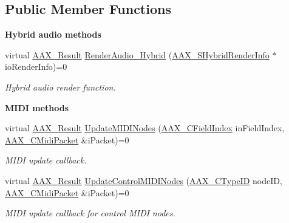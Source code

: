 \subsection*{Public Member Functions}
\begin{Indent}\textbf{ Hybrid audio methods}\par
\begin{DoxyCompactItemize}
\item 
virtual \mbox{\hyperlink{a00392_a4d8f69a697df7f70c3a8e9b8ee130d2f}{A\+A\+X\+\_\+\+Result}} \mbox{\hyperlink{a00805_gae6139041de22f51f3146d26a01c54c1b}{Render\+Audio\+\_\+\+Hybrid}} (\mbox{\hyperlink{a01673}{A\+A\+X\+\_\+\+S\+Hybrid\+Render\+Info}} $\ast$io\+Render\+Info)=0
\begin{DoxyCompactList}\small\item\em Hybrid audio render function. \end{DoxyCompactList}\end{DoxyCompactItemize}
\end{Indent}
\begin{Indent}\textbf{ M\+I\+DI methods}\par
\begin{DoxyCompactItemize}
\item 
virtual \mbox{\hyperlink{a00392_a4d8f69a697df7f70c3a8e9b8ee130d2f}{A\+A\+X\+\_\+\+Result}} \mbox{\hyperlink{a01677_a229029f0d4bd758538c48931b9f9a9ad}{Update\+M\+I\+D\+I\+Nodes}} (\mbox{\hyperlink{a00392_ae807f8986143820cfb5d6da32165c9c7}{A\+A\+X\+\_\+\+C\+Field\+Index}} in\+Field\+Index, \mbox{\hyperlink{a01429}{A\+A\+X\+\_\+\+C\+Midi\+Packet}} \&i\+Packet)=0
\begin{DoxyCompactList}\small\item\em M\+I\+DI update callback. \end{DoxyCompactList}\item 
virtual \mbox{\hyperlink{a00392_a4d8f69a697df7f70c3a8e9b8ee130d2f}{A\+A\+X\+\_\+\+Result}} \mbox{\hyperlink{a01677_ab4ec161f64086070083c21b566354861}{Update\+Control\+M\+I\+D\+I\+Nodes}} (\mbox{\hyperlink{a00392_ac678f9c1fbcc26315d209f71a147a175}{A\+A\+X\+\_\+\+C\+Type\+ID}} node\+ID, \mbox{\hyperlink{a01429}{A\+A\+X\+\_\+\+C\+Midi\+Packet}} \&i\+Packet)=0
\begin{DoxyCompactList}\small\item\em M\+I\+DI update callback for control M\+I\+DI nodes. \end{DoxyCompactList}\end{DoxyCompactItemize}
\end{Indent}


